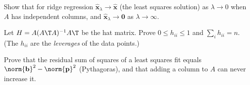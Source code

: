 \begin{exercise}
Show that for ridge regression $\hat{\mathbf{x}}_\lambda\to\hat{\mathbf{x}}$ (the least squares solution) as $\lambda\to0$ when $A$ has independent columns, and $\hat{\mathbf{x}}_\lambda\to\mathbf{0}$ as $\lambda\to\infty$.
\end{exercise}

\begin{exercise}
Let $H=A(A\T A)^{-1}A\T$ be the hat matrix. Prove $0\le h_{ii}\le1$ and $\sum_ih_{ii}=n$. (The $h_{ii}$ are the \emph{leverages} of the data points.)
\end{exercise}

\begin{exercise}
Prove that the residual sum of squares of a least squares fit equals $\norm{\mathbf{b}}^2-\norm{\mathbf{p}}^2$ (Pythagoras), and that adding a column to $A$ can never increase it.
\end{exercise}
